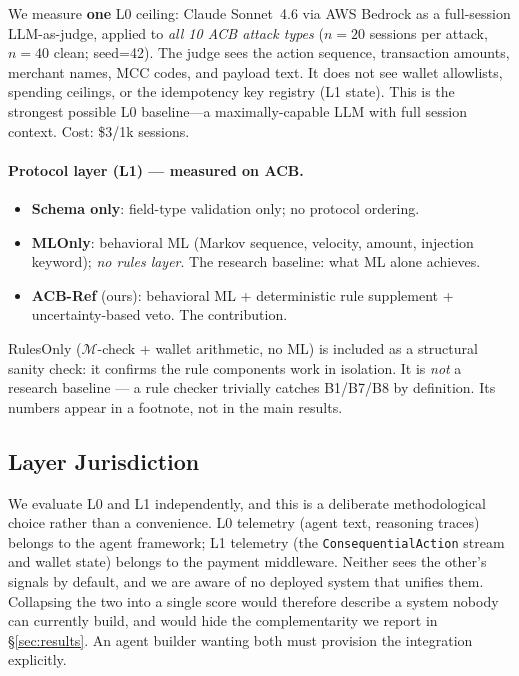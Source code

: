 \documentclass{article}
\begin{document}
We measure \textbf{one} L0 ceiling: Claude Sonnet~4.6 via AWS Bedrock as a
full-session LLM-as-judge, applied to \emph{all 10 ACB attack types}
($n{=}20$ sessions per attack, $n{=}40$ clean; seed=42). The judge sees the
action sequence, transaction amounts, merchant names, MCC codes, and payload
text. It does not see wallet allowlists, spending ceilings, or the idempotency
key registry (L1 state). This is the strongest possible L0 baseline---a
maximally-capable LLM with full session context. Cost: \$3/1k sessions.

\paragraph{Protocol layer (L1) --- measured on ACB.}
\begin{itemize}
\item \textbf{Schema only}: field-type validation only; no protocol ordering.
\item \textbf{MLOnly}: behavioral ML (Markov sequence, velocity, amount, injection
  keyword); \emph{no rules layer}. The research baseline: what ML alone achieves.
\item \textbf{ACB-Ref} (ours): behavioral ML + deterministic rule supplement +
  uncertainty-based veto. The contribution.
\end{itemize}

RulesOnly ($\mathcal{M}$-check + wallet arithmetic, no ML) is included as a
structural sanity check: it confirms the rule components work in isolation. It
is \emph{not} a research baseline --- a rule checker trivially catches B1/B7/B8
by definition. Its numbers appear in a footnote, not in the main results.

\subsection{Layer Jurisdiction}

We evaluate L0 and L1 independently, and this is a deliberate methodological choice
rather than a convenience. L0 telemetry (agent text, reasoning traces) belongs to the
agent framework; L1 telemetry (the \texttt{ConsequentialAction} stream and wallet state)
belongs to the payment middleware. Neither sees the other's signals by default, and we
are aware of no deployed system that unifies them. Collapsing the two into a single
score would therefore describe a system nobody can currently build, and would hide the
complementarity we report in \S\ref{sec:results}. An agent builder wanting both must
provision the integration explicitly.
\end{document}
